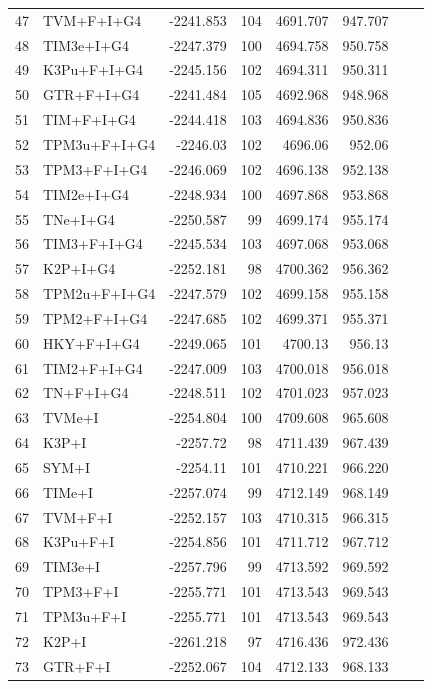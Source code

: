 \documentclass[fleqn,letterpaper]{article}
\begin{document}
\begin{longtable}{clrrrrrr}
	47 & TVM+F+I+G4 & -2241.853 & 104 & 4691.707 & 947.707 \\ 
	48 & TIM3e+I+G4 & -2247.379 & 100 & 4694.758 & 950.758 \\ 
	49 & K3Pu+F+I+G4 & -2245.156 & 102 & 4694.311 & 950.311 \\ 
	50 & GTR+F+I+G4 & -2241.484 & 105 & 4692.968 & 948.968 \\ 
	51 & TIM+F+I+G4 & -2244.418 & 103 & 4694.836 & 950.836 \\ 
	52 & TPM3u+F+I+G4 & -2246.03 & 102 & 4696.06 & 952.06 \\ 
	53 & TPM3+F+I+G4 & -2246.069 & 102 & 4696.138 & 952.138 \\ 
	54 & TIM2e+I+G4 & -2248.934 & 100 & 4697.868 & 953.868 \\ 
	55 & TNe+I+G4 & -2250.587 & 99 & 4699.174 & 955.174 \\ 
	56 & TIM3+F+I+G4 & -2245.534 & 103 & 4697.068 & 953.068 \\ 
	57 & K2P+I+G4 & -2252.181 & 98 & 4700.362 & 956.362 \\ 
	58 & TPM2u+F+I+G4 & -2247.579 & 102 & 4699.158 & 955.158 \\ 
	59 & TPM2+F+I+G4 & -2247.685 & 102 & 4699.371 & 955.371 \\ 
	60 & HKY+F+I+G4 & -2249.065 & 101 & 4700.13 & 956.13 \\ 
	61 & TIM2+F+I+G4 & -2247.009 & 103 & 4700.018 & 956.018 \\ 
	62 & TN+F+I+G4 & -2248.511 & 102 & 4701.023 & 957.023 \\ 
	63 & TVMe+I & -2254.804 & 100 & 4709.608 & 965.608 \\ 
	64 & K3P+I & -2257.72 & 98 & 4711.439 & 967.439 \\ 
	65 & SYM+I & -2254.11 & 101 & 4710.221 & 966.220 \\ 
	66 & TIMe+I & -2257.074 & 99 & 4712.149 & 968.149 \\ 
	67 & TVM+F+I & -2252.157 & 103 & 4710.315 & 966.315 \\ 
	68 & K3Pu+F+I & -2254.856 & 101 & 4711.712 & 967.712 \\ 
	69 & TIM3e+I & -2257.796 & 99 & 4713.592 & 969.592 \\ 
	70 & TPM3+F+I & -2255.771 & 101 & 4713.543 & 969.543 \\ 
	71 & TPM3u+F+I & -2255.771 & 101 & 4713.543 & 969.543 \\ 
	72 & K2P+I & -2261.218 & 97 & 4716.436 & 972.436 \\ 
	73 & GTR+F+I & -2252.067 & 104 & 4712.133 & 968.133 \\ 

\end{longtable}
\end{document}
